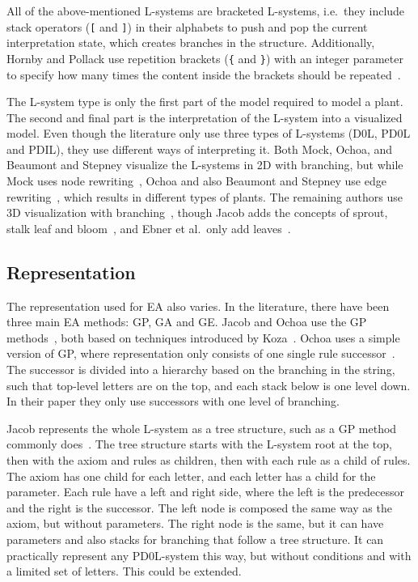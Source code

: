 All of the above-mentioned \glspl{L-system} are bracketed \glspl{L-system}, i.e.\ they include stack operators (\texttt{[} and \texttt{]}) in their alphabets to push and pop the current interpretation state, which creates branches in the structure.
Additionally, Hornby and Pollack use repetition brackets (\texttt{\{} and \texttt{\}}) with an integer parameter to specify how many times the content inside the brackets should be repeated~\cite{2001Hornby}.

The \gls{L-system} type is only the first part of the model required to model a plant.
The second and final part is the interpretation of the \gls{L-system} into a visualized model.
Even though the literature only use three types of \glspl{L-system} (D0L, PD0L and PDIL), they use different ways of interpreting it.
Both Mock, Ochoa, and Beaumont and Stepney visualize the \glspl{L-system} in 2D with branching, but while Mock uses node rewriting~\cite{1998Mock}, Ochoa and also Beaumont and Stepney use edge rewriting~\cite{1998Ochoa,2009Beaumont}, which results in different types of plants.
The remaining authors use 3D visualization with branching~\cite{1994Jacob,2006Ashlock}, though Jacob adds the concepts of sprout, stalk leaf and bloom~\cite{1995Jacob}, and Ebner et al.\ only add leaves~\cite{2002Ebner,2003Ebner}.

\subsection{Representation}
The representation used for \gls{EA} also varies.
In the literature, there have been three main \gls{EA} methods: \gls{GP}, \gls{GA} and \gls{GE}.
Jacob and Ochoa use the \gls{GP} methods~\cite{1994Jacob,1995Jacob,1998Ochoa}, both based on techniques introduced by Koza~\cite{1992Koza}.
Ochoa uses a simple version of \gls{GP}, where representation only consists of one single rule successor~\cite{1998Ochoa}.
The successor is divided into a hierarchy based on the branching in the string, such that top-level letters are on the top, and each stack below is one level down.
In their paper they only use successors with one level of branching.

Jacob represents the whole \gls{L-system} as a tree structure, such as a \gls{GP} method commonly does~\cite{1994Jacob}.
The tree structure starts with the \gls{L-system} root at the top, then with the axiom and rules as children, then with each rule as a child of rules.
The axiom has one child for each letter, and each letter has a child for the parameter.
Each rule have a left and right side, where the left is the predecessor and the right is the successor.
The left node is composed the same way as the axiom, but without parameters.
The right node is the same, but it can have parameters and also stacks for branching that follow a tree structure.
It can practically represent any PD0L-system this way, but without conditions and with a limited set of letters.
This could be extended.

